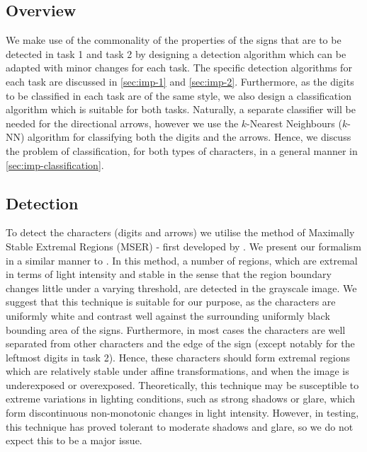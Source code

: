 \documentclass{article}
\begin{document}
\subsection{Overview}
\label{sec:imp-overview}

We make use of the commonality of the properties of the signs that are to be
detected in task 1 and task 2 by designing a detection algorithm which can be
adapted with minor changes for each task.
The specific detection algorithms for each task are discussed in
\autoref{sec:imp-1} and \autoref{sec:imp-2}.
Furthermore, as the digits to be classified in each task are of the same style,
we also design a classification algorithm which is suitable for both tasks.
Naturally, a separate classifier will be needed for the directional arrows,
however we use the $k$-Nearest Neighbours ($k$-NN) algorithm for classifying
both the digits and the arrows.
Hence, we discuss the problem of classification, for both types of characters,
in a general manner in \autoref{sec:imp-classification}.

\subsection{Detection}
\label{sec:imp-detection}

To detect the characters (digits and arrows) we utilise the method of
Maximally Stable Extremal Regions (MSER) - first developed by
\cite{MATAS2004761}.
We present our formalism in a similar manner to \cite{MATAS2004761}.
In this method, a number of regions, which are extremal in terms of light
intensity and stable in the sense that the region boundary changes little under
a varying threshold, are detected in the grayscale image.
We suggest that this technique is suitable for our purpose, as the characters
are uniformly white and contrast well against the surrounding uniformly black
bounding area of the signs.
Furthermore, in most cases the characters are well separated from other
characters and the edge of the sign (except notably for the leftmost digits in
task 2).
Hence, these characters should form extremal regions which are relatively stable
under affine transformations, and when the image is underexposed or overexposed.
Theoretically, this technique may be susceptible to extreme variations in
lighting conditions, such as strong shadows or glare, which form discontinuous
non-monotonic changes in light intensity.
However, in testing, this technique has proved tolerant to moderate shadows and
glare, so we do not expect this to be a major issue.
\end{document}
